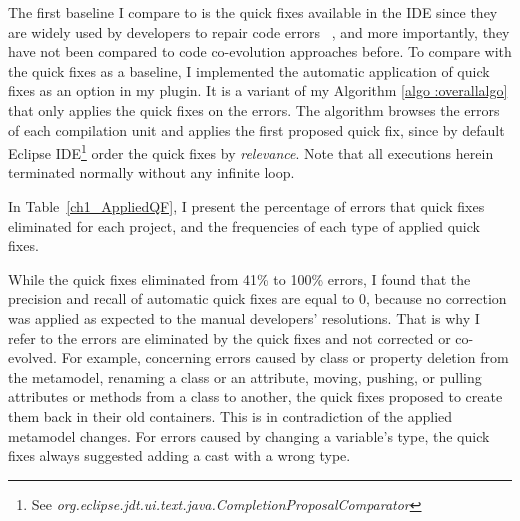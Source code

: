 The first baseline I compare to is the quick fixes available in the IDE since they are widely used by developers to repair code errors%
%
~\cite{10.1145/2384616.2384665}, and more importantly, they have not been compared to code co-evolution approaches before. 
To compare with the quick fixes as a baseline, I implemented the automatic application of quick fixes as an option in my plugin. It is a variant of my Algorithm \ref{algo :overallalgo} that only applies the quick fixes on the errors. 
The algorithm browses the errors of each compilation unit and applies the first proposed quick fix, since by default Eclipse IDE\footnote{See \emph{org.eclipse.jdt.ui.text.java.CompletionProposalComparator}} order the quick fixes by \emph{relevance}. Note that all executions herein terminated normally without any infinite loop.




In Table~\ref{ch1_AppliedQF}, I present the percentage of errors that quick fixes eliminated for each project, and the frequencies of each type of applied quick fixes. 

While the quick fixes eliminated from 41\% to 100\% errors, I found that the precision and recall of automatic quick fixes are equal to 0, because no correction was applied as expected to the manual developers' resolutions. That is why I refer to the errors are eliminated by the quick fixes and not corrected or co-evolved. 
For example, concerning errors caused by class or property deletion from the metamodel, renaming a class or an attribute, moving, pushing, or pulling attributes or methods from a class to another, the quick fixes proposed to create them back in their old containers. This is in contradiction of the applied metamodel changes.  
For errors caused by changing a variable's type, the quick fixes always suggested adding a cast with a wrong type. 

